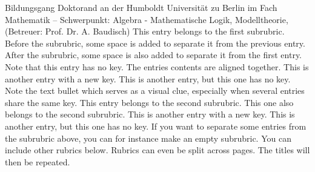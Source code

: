 





\begin{rubric}{Bildungsgang}
  Doktorand an der Humboldt Universit\"at zu Berlin im Fach Mathematik -- Schwerpunkt: Algebra - Mathematische
  Logik, Modelltheorie, (Betreuer: Prof. Dr. A. Baudisch)
\entry*[A Key]This entry belongs to the first subrubric. Before the subrubric,
  some space is added to separate it from the previous entry.
\entry*
  After the subrubric, some space is also added to separate it from the
  first entry. Note that this entry has no key. The entries contents are
  aligned together.
  This is another entry with a new key.
\entry*
  This is another entry, but this one has no key. Note the text bullet
  which serves as a visual clue, especially when several entries share the
  same key.
\entry*[A Key]
  This entry belongs to the second subrubric.
\entry*
  This one also belongs to the second subrubric.
  This is another entry with a new key.
\entry*
  This is another entry, but this one has no key.
  \subrubric{}
\entry*[A Key]
  If you want to separate some entries from the subrubric above,
  you can for instance make an empty subrubric.
\entry*
  You can include other rubrics below. Rubrics can even be split across
  pages. The titles will then be repeated.
\end{rubric}



